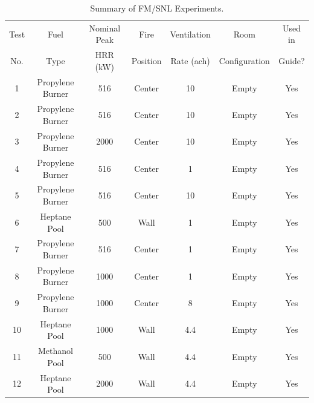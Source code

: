 \begin{table}[h!]
\caption[Summary of FM/SNL Experiments]{Summary of FM/SNL Experiments.}
\begin{center}
\begin{tabular}{|c|c|c|c|c|c|c|}
\hline
Test    &  Fuel             & Nominal Peak  & Fire          & Ventilation       & Room                  & Used in  \\
No.     &  Type             & HRR (kW)      & Position      & Rate (ach)        & Configuration         & Guide?      \\ \hline \hline
1       & Propylene Burner  &     516       & Center        & 10                & Empty                 &        Yes \\ \hline
2       & Propylene Burner  &     516       & Center        & 10                & Empty                 &        Yes \\ \hline
3       & Propylene Burner  &    2000       & Center        & 10                & Empty                 &        Yes \\ \hline
4       & Propylene Burner  &     516       & Center        & 1                 & Empty                 &        Yes \\ \hline
5       & Propylene Burner  &     516       & Center        & 10                & Empty                 &        Yes \\ \hline
6       & Heptane Pool      &     500       & Wall          & 1                 & Empty                 &        Yes \\ \hline
7       & Propylene Burner  &     516       & Center        & 1                 & Empty                 &        Yes \\ \hline
8       & Propylene Burner  &    1000       & Center        & 1                 & Empty                 &        Yes \\ \hline
9       & Propylene Burner  &    1000       & Center        & 8                 & Empty                 &        Yes \\ \hline
10      & Heptane Pool      &    1000       & Wall          & 4.4               & Empty                 &        Yes \\ \hline
11      & Methanol Pool     &     500       & Wall          & 4.4               & Empty                 &        Yes \\ \hline
12      & Heptane Pool      &    2000       & Wall          & 4.4               & Empty                 &        Yes \\ \hline

\end{tabular}
\end{center}
\end{table}
